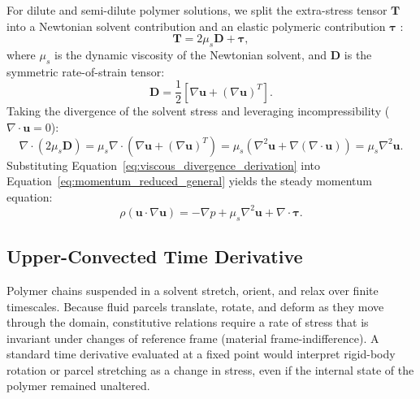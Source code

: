For dilute and semi-dilute polymer solutions,
we split the extra-stress tensor $\boldsymbol{T}$ into a Newtonian solvent contribution
and an elastic polymeric contribution $\boldsymbol{\tau}$ \cite{bird1987dynamics, macosko1994rheology}:
\begin{equation}
    \boldsymbol{T} = 2\mu_s \boldsymbol{D} + \boldsymbol{\tau} ,
    \label{eq:stress_decomposition}
\end{equation}
where $\mu_s$ is the dynamic viscosity of the Newtonian solvent,
and $\boldsymbol{D}$ is the symmetric rate-of-strain tensor:
\begin{equation}
    \boldsymbol{D} = \frac{1}{2} \left[ \nabla \boldsymbol{u} + (\nabla \boldsymbol{u})^T \right] .
    \label{eq:strain_rate_tensor}
\end{equation}
Taking the divergence of the solvent stress and leveraging incompressibility ($\nabla \cdot \boldsymbol{u} = 0$):
\begin{equation}
    \nabla \cdot (2\mu_s \boldsymbol{D}) = \mu_s \nabla \cdot \left( \nabla \boldsymbol{u} + (\nabla \boldsymbol{u})^T \right)
    = \mu_s \left( \nabla^2 \boldsymbol{u} + \nabla(\nabla \cdot \boldsymbol{u}) \right)
    = \mu_s \nabla^2 \boldsymbol{u} .
    \label{eq:viscous_divergence_derivation}
\end{equation}
Substituting Equation~\eqref{eq:viscous_divergence_derivation} into Equation~\eqref{eq:momentum_reduced_general} yields the steady momentum equation:
\begin{equation}
    \rho (\boldsymbol{u} \cdot \nabla \boldsymbol{u}) = -\nabla p + \mu_s \nabla^2 \boldsymbol{u} + \nabla \cdot \boldsymbol{\tau} .
    \label{eq:momentum_reduced}
\end{equation}

\subsection{Upper-Convected Time Derivative}
\label{subsec:uctd_definition}
Polymer chains suspended in a solvent stretch, orient, and relax over finite timescales.
Because fluid parcels translate, rotate, and deform as they move through the domain,
constitutive relations require a rate of stress that is invariant under changes of reference frame (material frame-indifference).
A standard time derivative evaluated at a fixed point would interpret rigid-body rotation or parcel stretching as a change in stress,
even if the internal state of the polymer remained unaltered.

